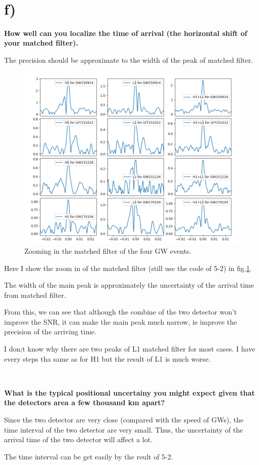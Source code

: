 \documentclass[showpacs, oneside, onecolumn, prl, amsmath, amssymb, nofootinbib, superscriptaddress, notitlepage]{revtex4-1}
\newcommand\bfig{\begin{figure}}
\newcommand\efig{\end{figure}}
\begin{document}
~~~~

\section{f)}

\textbf{How well can you localize the time of arrival (the horizontal shift of your matched filter).}

The precision should be approximate to the width of the peak of matched filter.

\bfig
	\centering
	\includegraphics[scale=0.7]{5-6-1.png}
	\caption{Zooming in the matched filter of the four GW events.}
	\label{5-6-1}
\efig

Here I show the zoom in of the matched filter (still use the code of 5-2) in fig.\ref{5-6-1}.

The width of the main peak is approximately the uncertainty of the arrival time from matched filter.

From this, we can see that although the combine of the two detector won't improve the SNR, it can make the main peak much narrow, ie improve the precision of the arriving time.

I don;t know why there are two peaks of L1 matched filter for most cases. I have every steps tha same as for H1 but the result of L1 is much worse.

~~~~

\textbf{What is the typical positional uncertainy you might expect given that the detectors area a few thousand km apart?}

Since the two detector are very close (compared with the speed of GWs), the time interval of the two detector are very small. Thus, the uncertainty of the arrival time of the two detector will affect a lot.

The time interval can be get easily by the reult of 5-2.
\end{document}
